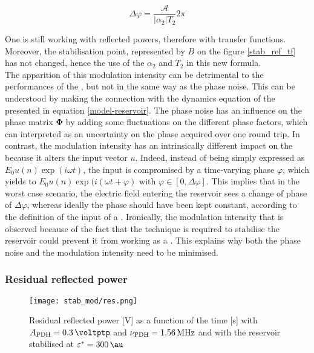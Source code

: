 \begin{equation}
	\Delta \varphi = \frac{\mathcal{A}}{|\alpha_2| T_2} 2\pi
\end{equation} 

One is still working with reflected powers, therefore with transfer functions. Moreover, the stabilisation point, represented by $B$ on the figure \ref{stab_ref_tf} has not changed, hence the use of the $\alpha_2$ and $T_2$ in this new formula.\\

The apparition of this modulation intensity can be detrimental to the performances of the \rcer, but not in the same way as the phase noise. This can be understood by making the connection with the dynamics equation of the \rcer presented in equation \eqref{model-reservoir}. The phase noise has an influence on the phase matrix $\mathbf{\Phi}$ by adding some fluctuations on the different phase factors, which can interpreted as an uncertainty on the phase acquired over one round trip. In contrast, the modulation intensity has an intrinsically different impact on the \rcer because it alters the input vector $u$. Indeed, instead of being simply expressed as $E_0u(n)\exp{(i\omega t)}$, the input is compromised by a time-varying phase $\varphi$, which yields to $E_0u(n)\exp{(i(\omega t+\varphi)}$ with $\varphi \in [0,\Delta \varphi]$. This implies that in the worst case scenario, the electric field entering the reservoir sees a change of phase of $\Delta \varphi$, whereas ideally the phase should have been kept constant, according to the definition of the input of a \rcer. Ironically, the modulation intensity that is observed because of the fact that the \pdh technique is required to stabilise the reservoir could prevent it from working as a \rcer. This explains why both the phase noise and the modulation intensity need to be minimised.


\subsubsection{Residual reflected power}

\begin{figure}
	\centering
	\texttt{[image: stab\_mod/res.png]}
	\caption{Residual reflected power [\si{\volt}] as a function of the time [\si{\second}] with $\tind{A}{PDH} = \SI{0.3}{\voltptp}$ and $\nu_{\text{PDH}} = \SI{1.56}{\mega\hertz}$ and with the reservoir stabilised at $\epsilon^* = \SI{300}{\au}$}
	\label{stab_res}
\end{figure}

